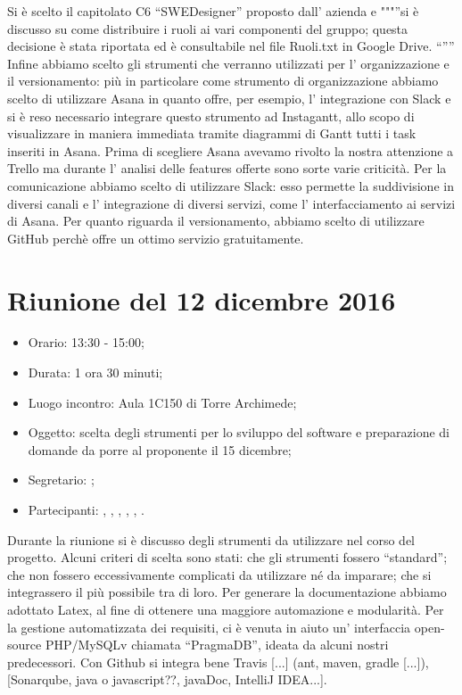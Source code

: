 Si è scelto il capitolato C6 “SWEDesigner” proposto dall' azienda \ZU e """”si è discusso su come distribuire i ruoli ai vari componenti del gruppo; questa decisione è stata riportata ed è consultabile nel file Ruoli.txt in Google Drive. “””
Infine abbiamo scelto gli strumenti che verranno utilizzati per l' organizzazione e il versionamento: più in particolare come strumento di organizzazione abbiamo scelto di utilizzare Asana in quanto offre, per esempio, l' integrazione con Slack e si è reso necessario integrare questo strumento ad Instagantt, allo scopo di visualizzare in maniera immediata tramite diagrammi di Gantt tutti i task inseriti in Asana. Prima di scegliere Asana avevamo rivolto la nostra attenzione a Trello ma durante l' analisi delle features offerte sono sorte varie criticità. Per la comunicazione abbiamo scelto di utilizzare Slack: esso permette la suddivisione in diversi canali e l' integrazione di diversi servizi, come l' interfacciamento ai servizi di Asana. Per quanto riguarda il versionamento, abbiamo scelto di utilizzare  GitHub perchè offre un ottimo servizio gratuitamente.



\section{Riunione del 12 dicembre 2016}

\begin{itemize}
	\item Orario: 13:30 - 15:00;
	\item Durata: 1 ora 30 minuti;
	\item Luogo incontro: Aula 1C150 di Torre Archimede; 
	\item Oggetto: scelta degli strumenti per lo sviluppo del software e preparazione di domande da porre al proponente il 15 dicembre;
	\item Segretario: \PB; 
	\item Partecipanti: \AZ, \GG, \LB, \LS, \MM, \PB.
\end{itemize}

Durante la riunione si è discusso degli strumenti da utilizzare nel corso del progetto. Alcuni criteri di scelta sono stati: che gli strumenti fossero “standard”; che non fossero eccessivamente complicati da utilizzare né da imparare; che si integrassero il più possibile tra di loro. Per generare la documentazione abbiamo adottato Latex, al fine di ottenere una maggiore automazione e modularità. Per la gestione automatizzata dei requisiti, ci è venuta in aiuto un' interfaccia open-source PHP/MySQLv chiamata “PragmaDB”, ideata da alcuni nostri predecessori. Con Github si integra bene Travis [...] (ant, maven, gradle [...]), [Sonarqube, java o javascript??, javaDoc, IntelliJ IDEA...].

